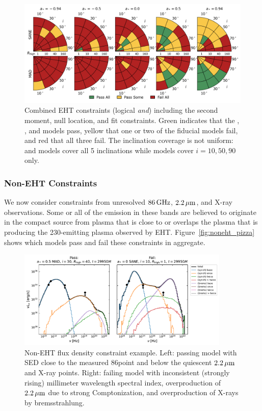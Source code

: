\begin{figure}\label{fig:all_EHT_constraints}
  \centering
    \includegraphics[width=\textwidth]{./figures/Interferometric_Constraints.png}
  \caption{Combined EHT constraints (logical {\em and}) including the second moment, null location, and \mring fit constraints.  Green indicates that the \kharma, \bhac, and \hamr models pass, yellow that one or two of the fiducial models fail, and red that all three fail.  The inclination coverage is not uniform: \bhac and \kharma models cover all 5 inclinations while \hamr models cover $i = 10, 50, 90$ only.}
\end{figure}

\subsubsection{Non-EHT Constraints}

We now consider constraints from unresolved $86\,\mathrm{GHz}$, $2.2\,\mu\mathrm{m}$, and X-ray
observations.
Some or all of the emission in these bands are believed to originate
in the compact source from plasma that is close to or overlaps the
plasma that is producing the 230\GHz-emitting plasma observed by EHT.
Figure~\ref{fig:noneht_pizza} shows which models pass and fail these
constraints in aggregate.

\begin{figure}
  \centering
  \includegraphics[width=0.9\textwidth]{figures/passfail_sed.pdf}
  \caption{
    Non-EHT flux density constraint example.  Left: passing model with SED close to the measured 86\GHz point and below the quiescent $2.2\,\mu\mathrm{m}$ and X-ray points.  Right: failing model with inconsistent (strongly rising) millimeter wavelength spectral index, overproduction of $2.2\,\mu\mathrm{m}$ due to strong Comptonization, and overproduction of X-rays by bremsstrahlung.
    }
  \label{fig:passfail_sed}
\end{figure}

